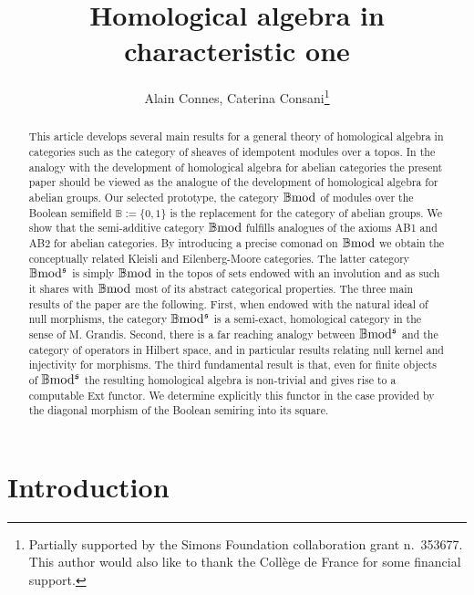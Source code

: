 \documentclass[12pt]{article}
\title
{Homological algebra in characteristic one}
\author{Alain Connes, Caterina Consani\thanks{Partially supported by the Simons Foundation collaboration grant n.~353677. This author would also like to thank the Coll\`ege de France for some financial support.}}
\date{}
\def\B{{\mathbb B}}
\def\bmod{{\rm \B mod}}
\def\b2{{\rm \B mod^{\mathfrak s}}}
\begin{document}
\maketitle



\begin{abstract}This article  develops several main results for a general theory of homological algebra in categories such as the category of  sheaves of idempotent modules over a topos. In the analogy with the development of homological algebra   for abelian categories the present paper should be viewed as the analogue  of the development of homological algebra for abelian groups. Our selected prototype, the category $\bmod$ of modules over the Boolean semifield $\B:=\{0,1\}$  is the replacement for the category of abelian groups. We show that the semi-additive category $\bmod$ fulfills analogues of the axioms AB1 and AB2 for abelian categories. By introducing a precise comonad on $\bmod$ we obtain the conceptually related  Kleisli and Eilenberg-Moore categories. The latter category $\b2$ is simply $\bmod$ in the topos of sets endowed with an involution and as such it shares with $\bmod$ most of its abstract categorical properties. The three main results of the paper are the following. First, when endowed with the natural ideal of null morphisms, the category $\b2$ is a semi-exact, homological category in the sense of M. Grandis. Second, there is a far reaching analogy between $\b2$ and the category of operators in Hilbert space, and in particular results relating null kernel and injectivity for morphisms. The third fundamental result is  that, even for finite objects of $\b2$ the resulting homological algebra is non-trivial and  gives rise to a computable Ext functor. We determine explicitly this functor in the case provided by the diagonal morphism of the Boolean semiring into its square.
	
\end{abstract}



\vspace{0.5in}

\tableofcontents


\section{Introduction}
\end{document}
